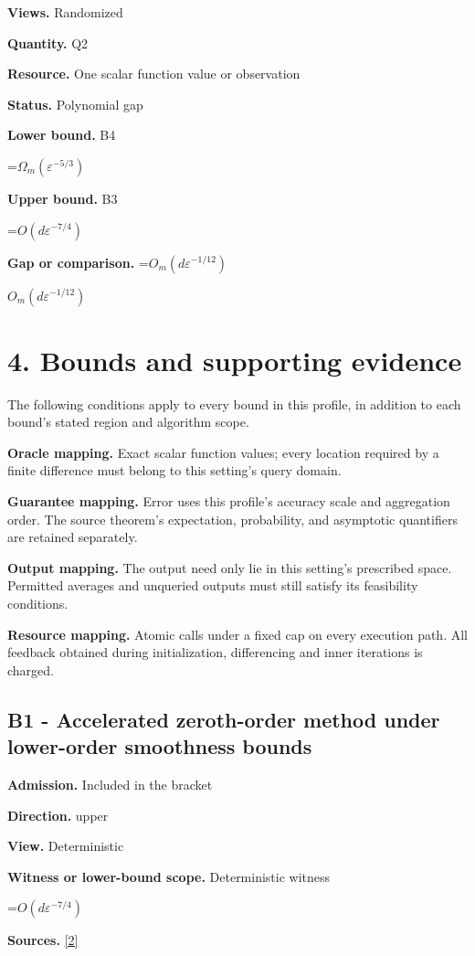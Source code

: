 \documentclass[10pt,a4paper]{article}
\newcommand{\AtlasMath}[1]{\par\begingroup\centering\setbox0=\hbox{$\displaystyle #1$}\ifdim\wd0>1.4\linewidth\typeout{ATLAS WIDE FORMULA: \the\wd0}\fi\ifdim\wd0>\linewidth\resizebox{\linewidth}{!}{\box0}\else\box0\fi\par\endgroup}
\newcommand{\AtlasInlineMath}[1]{\begingroup\setbox0=\hbox{$#1$}\ifdim\wd0>.4\linewidth\endgroup\AtlasMath{#1}\else\endgroup$#1$\fi}
\begin{document}
\textbf{Views.} Randomized

\textbf{Quantity.} Q2

\textbf{Resource.} One scalar function value or observation

\textbf{Status.} Polynomial gap

\textbf{Lower bound.} B4

\AtlasMath{\Omega_m(\varepsilon^{-5/3})}
\textbf{Upper bound.} B3

\AtlasMath{O(d\varepsilon^{-7/4})}
\textbf{Gap or comparison.} \AtlasInlineMath{O_m(d\varepsilon^{-1/12})}

\section{4. Bounds and supporting evidence}
The following conditions apply to every bound in this profile, in addition to each bound's stated region and algorithm scope.

\textbf{Oracle mapping.} Exact scalar function values; every location required by a finite difference must belong to this setting's query domain.

\textbf{Guarantee mapping.} Error uses this profile's accuracy scale and aggregation order. The source theorem's expectation, probability, and asymptotic quantifiers are retained separately.

\textbf{Output mapping.} The output need only lie in this setting's prescribed space. Permitted averages and unqueried outputs must still satisfy its feasibility conditions.

\textbf{Resource mapping.} Atomic calls under a fixed cap on every execution path. All feedback obtained during initialization, differencing and inner iterations is charged.

\subsection{B1 - Accelerated zeroth-order method under lower-order smoothness bounds}
\textbf{Admission.} Included in the bracket

\textbf{Direction.} upper

\textbf{View.} Deterministic

\textbf{Witness or lower-bound scope.} Deterministic witness

\AtlasMath{O(d\varepsilon^{-7/4})}
\textbf{Sources.} \href{https://proceedings.mlr.press/v235/he24h.html}{[2]}
\end{document}
